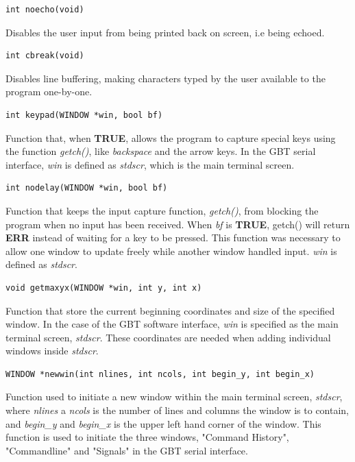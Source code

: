 \documentclass[main.tex]{subfiles}
\begin{document}
\begin{lstlisting}[frame=single] 
int noecho(void)
\end{lstlisting}
Disables the user input from being printed back on screen, i.e being echoed.  \\

\begin{lstlisting}[frame=single] 
int cbreak(void)
\end{lstlisting}
Disables line buffering, making characters typed by the user available to the program one-by-one.\\

\begin{lstlisting}[frame=single] 
int keypad(WINDOW *win, bool bf)
\end{lstlisting}
Function that, when \textbf{TRUE}, allows the program to capture special keys using the function \textit{getch()}, like \textit{backspace} and the arrow keys. In the GBT serial interface, \textit{win} is defined as \textit{stdscr}, which is the main terminal screen. \\

\begin{lstlisting}[frame=single] 
int nodelay(WINDOW *win, bool bf)
\end{lstlisting}
Function that keeps the input capture function, \textit{getch()}, from blocking the program when no input has been received. When \textit{bf} is \textbf{TRUE}, getch() will return \textbf{ERR} instead of waiting for a key to be pressed. This function was necessary to allow one window to update freely while another window handled input. \textit{win} is defined as \textit{stdscr}.\\

\begin{lstlisting}[frame=single] 
void getmaxyx(WINDOW *win, int y, int x)
\end{lstlisting}
Function that store the current beginning coordinates and size of the specified window. In the case of the GBT software interface, \textit{win} is specified as the main terminal screen, \textit{stdscr}. These coordinates are needed when adding individual windows inside \textit{stdscr}. \\

\begin{lstlisting}[frame=single] 
WINDOW *newwin(int nlines, int ncols, int begin_y, int begin_x)
\end{lstlisting}
Function used to initiate a new window within the main terminal screen, \textit{stdscr}, where \textit{nlines} a \textit{ncols} is the number of lines and columns the window is to contain, and \textit{begin\_y} and \textit{begin\_x} is the upper left hand corner of the window. This function is used to initiate the three windows, "Command History", "Commandline" and "Signals" in the GBT serial interface.\\
\end{document}
